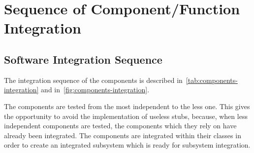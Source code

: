 \section{Sequence of Component/Function Integration}
\label{sec:sequence-integration}

\subsection{Software Integration Sequence}
The integration sequence of the components is described in~\autoref{tab:components-integration} and in~\autoref{fig:components-integration}.

The components are tested from the most independent to the less one. This gives the opportunity to avoid the implementation of useless stubs, because, when less independent components are tested, the components which they rely on have already been integrated.
The components are integrated within their classes in order to create an integrated subsystem which is ready for subsystem integration.

